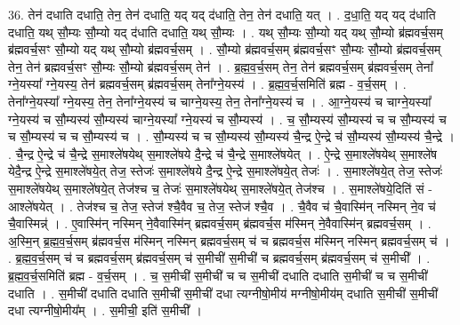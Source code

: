 \documentclass[17pt]{extarticle}
\begin{document}
36. तेन॑ दधाति दधाति॒ तेन॒ तेन॑ दधाति॒ यद् यद् द॑धाति॒ तेन॒ तेन॑ दधाति॒ यत् । . द॒धा॒ति॒ यद् यद् द॑धाति दधाति॒ यथ् सौ॒म्यः सौ॒म्यो यद् द॑धाति दधाति॒ यथ् सौ॒म्यः । . यथ् सौ॒म्यः सौ॒म्यो यद् यथ् सौ॒म्यो ब्र॑ह्मवर्च॒सम् ब्र॑ह्मवर्च॒सꣳ सौ॒म्यो यद् यथ् सौ॒म्यो ब्र॑ह्मवर्च॒सम् । . सौ॒म्यो ब्र॑ह्मवर्च॒सम् ब्र॑ह्मवर्च॒सꣳ सौ॒म्यः सौ॒म्यो ब्र॑ह्मवर्च॒सम् तेन॒ तेन॑ ब्रह्मवर्च॒सꣳ सौ॒म्यः सौ॒म्यो ब्र॑ह्मवर्च॒सम् तेन॑ । . ब्र॒ह्म॒व॒र्च॒सम् तेन॒ तेन॑ ब्रह्मवर्च॒सम् ब्र॑ह्मवर्च॒सम् तेना᳚ ग्ने॒यस्या᳚ ग्ने॒यस्य॒ तेन॑ ब्रह्मवर्च॒सम् ब्र॑ह्मवर्च॒सम् तेना᳚ग्ने॒यस्य॑ । . ब्र॒ह्म॒व॒र्च॒समिति॑ ब्रह्म - व॒र्च॒सम् । . तेना᳚ग्ने॒यस्या᳚ ग्ने॒यस्य॒ तेन॒ तेना᳚ग्ने॒यस्य॑ च चाग्ने॒यस्य॒ तेन॒ तेना᳚ग्ने॒यस्य॑ च । . आ॒ग्ने॒यस्य॑ च चाग्ने॒यस्या᳚ ग्ने॒यस्य॑ च सौ॒म्यस्य॑ सौ॒म्यस्य॑ चाग्ने॒यस्या᳚ ग्ने॒यस्य॑ च सौ॒म्यस्य॑ । . च॒ सौ॒म्यस्य॑ सौ॒म्यस्य॑ च च सौ॒म्यस्य॑ च च सौ॒म्यस्य॑ च च सौ॒म्यस्य॑ च । . सौ॒म्यस्य॑ च च सौ॒म्यस्य॑ सौ॒म्यस्य॑ चै॒न्द्र ऐ॒न्द्रे च॑ सौ॒म्यस्य॑ सौ॒म्यस्य॑ चै॒न्द्रे । . चै॒न्द्र ऐ॒न्द्रे च॑ चै॒न्द्रे स॒माश्ले॑षयेथ् स॒माश्ले॑षये दै॒न्द्रे च॑ चै॒न्द्रे स॒माश्ले॑षयेत् । . ऐ॒न्द्रे स॒माश्ले॑षयेथ् स॒माश्ले॑ष येदै॒न्द्र ऐ॒न्द्रे स॒माश्ले॑षये॒त् तेज॒ स्तेजः॑ स॒माश्ले॑षये दै॒न्द्र ऐ॒न्द्रे स॒माश्ले॑षये॒त् तेजः॑ । . स॒माश्ले॑षये॒त् तेज॒ स्तेजः॑ स॒माश्ले॑षयेथ् स॒माश्ले॑षये॒त् तेज॑श्च च॒ तेजः॑ स॒माश्ले॑षयेथ् स॒माश्ले॑षये॒त् तेज॑श्च । . स॒माश्ले॑षये॒दिति॑ सं - आश्ले॑षयेत् । . तेज॑श्च च॒ तेज॒ स्तेज॑ श्चै॒वैव च॒ तेज॒ स्तेज॑ श्चै॒व । . चै॒वैव च॑ चै॒वास्मि॑न् नस्मिन् ने॒व च॑ चै॒वास्मिन्न्॑ । . ए॒वास्मि॑न् नस्मिन् ने॒वैवास्मि॑न् ब्रह्मवर्च॒सम् ब्र॑ह्मवर्च॒स म॑स्मिन् ने॒वैवास्मि॑न् ब्रह्मवर्च॒सम् । . अ॒स्मि॒न् ब्र॒ह्म॒व॒र्च॒सम् ब्र॑ह्मवर्च॒स म॑स्मिन् नस्मिन् ब्रह्मवर्च॒सम् च॑ च ब्रह्मवर्च॒स म॑स्मिन् नस्मिन् ब्रह्मवर्च॒सम् च॑ । . ब्र॒ह्म॒व॒र्च॒सम् च॑ च ब्रह्मवर्च॒सम् ब्र॑ह्मवर्च॒सम् च॑ स॒मीची॑ स॒मीची॑ च ब्रह्मवर्च॒सम् ब्र॑ह्मवर्च॒सम् च॑ स॒मीची᳚ । . ब्र॒ह्म॒व॒र्च॒समिति॑ ब्रह्म - व॒र्च॒सम् । . च॒ स॒मीची॑ स॒मीची॑ च च स॒मीची॑ दधाति दधाति स॒मीची॑ च च स॒मीची॑ दधाति । . स॒मीची॑ दधाति दधाति स॒मीची॑ स॒मीची॑ दधा त्यग्नीषो॒मीय॑ मग्नीषो॒मीय॑म् दधाति स॒मीची॑ स॒मीची॑ दधा त्यग्नीषो॒मीय᳚म् । . स॒मीची॒ इति॑ स॒मीची᳚ । \newline
\pagebreak
{}
\end{document}
